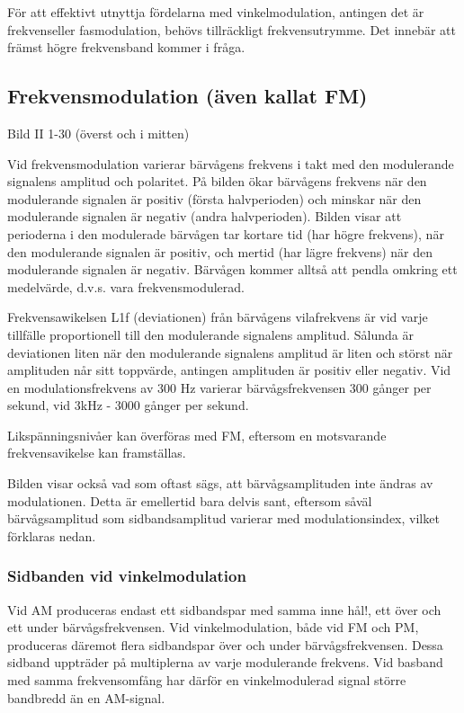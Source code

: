 För att effektivt utnyttja fördelarna med vinkelmodulation, antingen det är frekvenseller
fasmodulation, behövs tillräckligt frekvensutrymme. Det innebär att främst högre
frekvensband kommer i fråga.

\subsection{Frekvensmodulation (även kallat FM)}

Bild II 1-30 (överst och i mitten)

Vid frekvensmodulation varierar bärvågens frekvens i takt med den modulerande signalens
amplitud och polaritet. På bilden ökar bärvågens frekvens när den modulerande signalen är
positiv (första halvperioden) och minskar när den modulerande signalen är negativ (andra
halvperioden). Bilden visar att perioderna i den modulerade bärvågen tar kortare tid (har
högre frekvens), när den modulerande signalen är positiv, och mertid (har lägre frekvens)
när den modulerande signalen är negativ. Bärvågen kommer alltså att pendla omkring ett
medelvärde, d.v.s. vara frekvensmodulerad.

Frekvensawikelsen L1f (deviationen) från bärvågens vilafrekvens är vid varje tillfälle
proportionell till den modulerande signalens amplitud. Sålunda är deviationen liten när
den modulerande signalens amplitud är liten och störst när amplituden når sitt toppvärde,
antingen amplituden är positiv eller negativ. Vid en modulationsfrekvens av 300 Hz
varierar bärvågsfrekvensen 300 gånger per sekund, vid 3kHz - 3000 gånger per sekund.

Likspänningsnivåer kan överföras med FM, eftersom en motsvarande frekvensavikelse kan
framställas.

Bilden visar också vad som oftast sägs, att bärvågsamplituden inte ändras av modulationen.
Detta är emellertid bara delvis sant, eftersom såväl bärvågsamplitud som sidbandsamplitud
varierar med modulationsindex, vilket förklaras nedan.

\subsubsection{Sidbanden vid vinkelmodulation}

Vid AM produceras endast ett sidbandspar med samma inne hål!, ett över och ett under
bärvågsfrekvensen. Vid vinkelmodulation, både vid FM och PM, produceras däremot flera
sidbandspar över och under bärvågsfrekvensen. Dessa sidband uppträder på multiplerna av
varje modulerande frekvens. Vid basband med samma frekvensomfång har därför en
vinkelmodulerad signal större bandbredd än en AM-signal.

